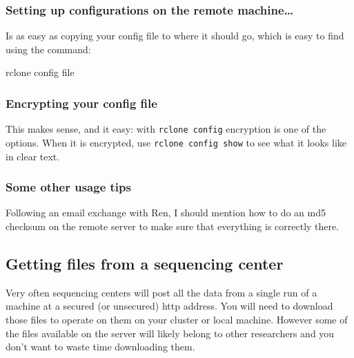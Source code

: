 \documentclass[]{krantz}
\makeatletter
\newenvironment{Shaded}{\begin{snugshade}}{\end{snugshade}}
\newcommand{\ExtensionTok}[1]{#1}
\newcommand{\NormalTok}[1]{#1}
\newenvironment{kframe}{%
\medskip{}
\setlength{\fboxsep}{.8em}
 \def\at@end@of@kframe{}%
 \ifinner\ifhmode%
  \def\at@end@of@kframe{\end{minipage}}%
  \begin{minipage}{\columnwidth}%
 \fi\fi%
 \def\FrameCommand##1{\hskip\@totalleftmargin \hskip-\fboxsep
 \colorbox{shadecolor}{##1}\hskip-\fboxsep
     \hskip-\linewidth \hskip-\@totalleftmargin \hskip\columnwidth}%
 \MakeFramed {\advance\hsize-\width
   \@totalleftmargin\z@ \linewidth\hsize
   \@setminipage}}%
 {\par\unskip\endMakeFramed%
 \at@end@of@kframe}
\renewenvironment{Shaded}{\begin{kframe}}{\end{kframe}}
\makeatother
\begin{document}
\hypertarget{setting-up-configurations-on-the-remote-machine}{%
\subsubsection{Setting up configurations on the remote machine\ldots{}}\label{setting-up-configurations-on-the-remote-machine}}

Is as easy as copying your config file to where it should go, which
is easy to find using the command:

\begin{Shaded}
\begin{Highlighting}[]
\ExtensionTok{rclone}\NormalTok{ config file}
\end{Highlighting}
\end{Shaded}

\hypertarget{encrypting-your-config-file}{%
\subsubsection{Encrypting your config file}\label{encrypting-your-config-file}}

This makes sense, and it easy: with \texttt{rclone\ config} encryption is one of
the options. When it is encrypted, use \texttt{rclone\ config\ show} to see what
it looks like in clear text.

\hypertarget{some-other-usage-tips}{%
\subsubsection{Some other usage tips}\label{some-other-usage-tips}}

Following an email exchange with Ren, I should mention how to do an md5
checksum on the remote server to make sure that everything is correctly there.

\hypertarget{getting-files-from-a-sequencing-center}{%
\subsection{Getting files from a sequencing center}\label{getting-files-from-a-sequencing-center}}

Very often sequencing centers will post all the data from a single
run of a machine at a secured (or unsecured) http address. You will
need to download those files to operate on them on your cluster or
local machine. However some of the files available on the server
will likely belong to other researchers and you don't want to waste time
downloading them.
\end{document}
